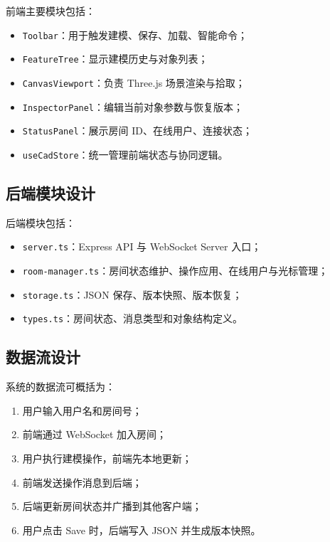 \documentclass[supercite,macfont]{HustGSClassPaper}
\begin{document}
前端主要模块包括：

\begin{itemize}[leftmargin=2em]
  \item \texttt{Toolbar}：用于触发建模、保存、加载、智能命令；
  \item \texttt{FeatureTree}：显示建模历史与对象列表；
  \item \texttt{CanvasViewport}：负责 Three.js 场景渲染与拾取；
  \item \texttt{InspectorPanel}：编辑当前对象参数与恢复版本；
  \item \texttt{StatusPanel}：展示房间 ID、在线用户、连接状态；
  \item \texttt{useCadStore}：统一管理前端状态与协同逻辑。
\end{itemize}

\subsection{后端模块设计}

后端模块包括：

\begin{itemize}[leftmargin=2em]
  \item \texttt{server.ts}：Express API 与 WebSocket Server 入口；
  \item \texttt{room-manager.ts}：房间状态维护、操作应用、在线用户与光标管理；
  \item \texttt{storage.ts}：JSON 保存、版本快照、版本恢复；
  \item \texttt{types.ts}：房间状态、消息类型和对象结构定义。
\end{itemize}

\subsection{数据流设计}

系统的数据流可概括为：

\begin{enumerate}[leftmargin=2em]
  \item 用户输入用户名和房间号；
  \item 前端通过 WebSocket 加入房间；
  \item 用户执行建模操作，前端先本地更新；
  \item 前端发送操作消息到后端；
  \item 后端更新房间状态并广播到其他客户端；
  \item 用户点击 Save 时，后端写入 JSON 并生成版本快照。
\end{enumerate}
\end{document}
